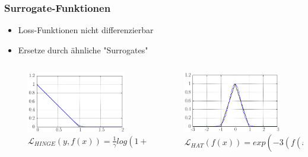 \documentclass{beamer}
\begin{document}
\begin{frame}
    \frametitle{Surrogate-Funktionen}
    
    \begin{itemize}
    	\item Loss-Funktionen nicht differenzierbar
    	\item Ersetze durch \"ahnliche "Surrogates"
    \end{itemize}
    \begin{columns}[onlytextwidth]
        \begin{column}{.45\textwidth}
            \begin{figure}
                \includegraphics[width=\textwidth]{img/hinge_loss_surrogate_function.png}
                \caption{$\mathcal{L}_{HINGE}(y, f(x)) = \frac{1}{\gamma} log(1 + exp(\gamma(1-y_i' f(x_i))))$}
            \end{figure}
        \end{column}
        \hfill
        \begin{column}{.45\textwidth}
            \begin{figure}
                \includegraphics[width=\textwidth]{img/hat_loss_surrogate_function.png}
                \caption{$\mathcal{L}_{HAT}(f(x)) = exp(-3(f(x_{l+i}))^2)$}
            \end{figure}
        \end{column}
    \end{columns}
\end{frame}
\end{document}
